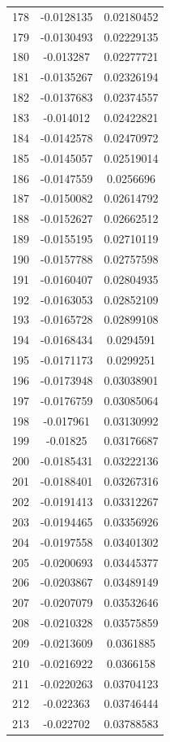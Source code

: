 \documentclass[a4paper, 11pt, oneside]{report}
\begin{document}
{\begin{longtable}{|c|c|c|}
178 & -0.0128135 & 0.02180452 \\
179 & -0.0130493 & 0.02229135 \\
180 & -0.013287  & 0.02277721 \\
181 & -0.0135267 & 0.02326194 \\
182 & -0.0137683 & 0.02374557 \\
183 & -0.014012  & 0.02422821 \\
184 & -0.0142578 & 0.02470972 \\
185 & -0.0145057 & 0.02519014 \\
186 & -0.0147559 & 0.0256696  \\
187 & -0.0150082 & 0.02614792 \\
188 & -0.0152627 & 0.02662512 \\
189 & -0.0155195 & 0.02710119 \\
190 & -0.0157788 & 0.02757598 \\
191 & -0.0160407 & 0.02804935 \\
192 & -0.0163053 & 0.02852109 \\
193 & -0.0165728 & 0.02899108 \\
194 & -0.0168434 & 0.0294591  \\
195 & -0.0171173 & 0.0299251  \\
196 & -0.0173948 & 0.03038901 \\
197 & -0.0176759 & 0.03085064 \\
198 & -0.017961  & 0.03130992 \\
199 & -0.01825   & 0.03176687 \\
200 & -0.0185431 & 0.03222136 \\
201 & -0.0188401 & 0.03267316 \\
202 & -0.0191413 & 0.03312267 \\
203 & -0.0194465 & 0.03356926 \\
204 & -0.0197558 & 0.03401302 \\
205 & -0.0200693 & 0.03445377 \\
206 & -0.0203867 & 0.03489149 \\
207 & -0.0207079 & 0.03532646 \\
208 & -0.0210328 & 0.03575859 \\
209 & -0.0213609 & 0.0361885  \\
210 & -0.0216922 & 0.0366158  \\
211 & -0.0220263 & 0.03704123 \\
212 & -0.022363  & 0.03746444 \\
213 & -0.022702  & 0.03788583 \\

\end{longtable}}
\end{document}
